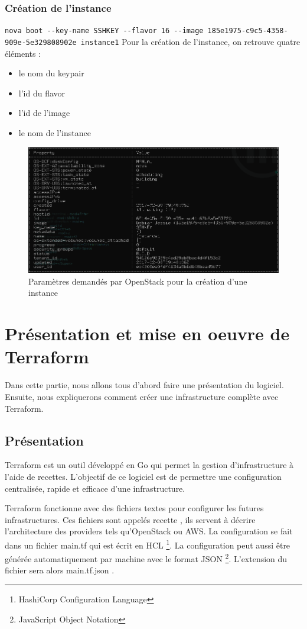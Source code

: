 \documentclass[]{article}
\begin{document}
\subsubsection{Création de l'instance}\label{cruxe9ation-de-linstance-1}
\texttt{nova\ boot\ -\/-key-name\ SSHKEY\ -\/-flavor\ 16\ -\/-image\ 185e1975-c9c5-4358-909e-5e329808902e\ instance1}
Pour la création de l'instance, on retrouve quatre éléments : 
\begin{itemize}
\item le nom du keypair 
\item l'id du flavor 
\item l'id de l'image
\item le nom de l'instance
\end{itemize}
\vspace{5mm}
\begin{figure}
\centering
\includegraphics{Images/eeee.png}
\caption{Paramètres demandés par OpenStack pour la création d'une instance}
\end{figure}
\newpage
\section{Présentation et mise en oeuvre de Terraform}\label{terraform}
Dans cette partie, nous allons tous d'abord faire une présentation du logiciel. Ensuite, nous expliquerons comment créer une infrastructure complète avec Terraform.
\subsection{Présentation}\label{pruxe9senation}
Terraform est un outil développé en Go qui permet la gestion
d'infrastructure à l'aide de recettes. L'objectif de ce logiciel est de
permettre une configuration centralisée, rapide et efficace d'une
infrastructure.

Terraform fonctionne avec des fichiers textes pour configurer les futures
infrastructures. Ces fichiers sont appelés \og recette
\fg , ils servent à décrire l'architecture des providers tels
qu'OpenStack ou AWS. La configuration se fait dans un fichier
\og main.tf \fg qui est écrit en HCL \footnote{HashiCorp Configuration Language}. La configuration peut aussi être
générée automatiquement par machine avec le format JSON \footnote{JavaScript Object Notation}.
L'extension du fichier sera alors \og main.tf.json
\fg.
\end{document}
